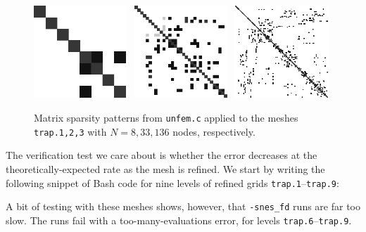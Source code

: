 \begin{figure}
\includegraphics[width=0.31\textwidth]{figs/trap1mat} \, \includegraphics[width=0.31\textwidth]{figs/trap2mat} \, \includegraphics[width=0.31\textwidth]{figs/trap3mat}
\caption{Matrix sparsity patterns from \texttt{unfem.c} applied to the meshes \texttt{trap.1,2,3} with $N=8,33,136$ nodes, respectively.}
\label{fig:un:unfem-matsparsity}
\end{figure}

The verification test we care about is whether the error decreases at the theoretically-expected rate as the mesh is refined.  We start by writing the following snippet of Bash code for nine levels of refined grids \texttt{trap.1}--\texttt{trap.9}:

A bit of testing with these meshes shows, however, that \texttt{-snes\_fd} runs are far too slow.  The runs fail with a too-many-evaluations error, for levels \texttt{trap.6}--\texttt{trap.9}.

